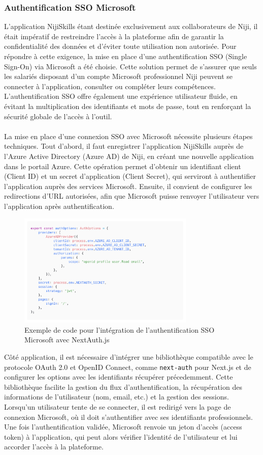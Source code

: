 \documentclass[12pt]{article}
\begin{document}
\subsubsection{Authentification SSO Microsoft}
L’application NijiSkills étant destinée exclusivement aux collaborateurs de Niji, il était impératif de restreindre l’accès à la plateforme afin de garantir la confidentialité des données et d’éviter toute utilisation non autorisée. Pour répondre à cette exigence, la mise en place d’une authentification SSO (Single Sign-On) via Microsoft a été choisie. Cette solution permet de s’assurer que seuls les salariés disposant d’un compte Microsoft professionnel Niji peuvent se connecter à l’application, consulter ou compléter leurs compétences. L’authentification SSO offre également une expérience utilisateur fluide, en évitant la multiplication des identifiants et mots de passe, tout en renforçant la sécurité globale de l’accès à l’outil.
\\\\
La mise en place d’une connexion SSO avec Microsoft nécessite plusieurs étapes techniques. Tout d’abord, il faut enregistrer l’application NijiSkills auprès de l’Azure Active Directory (Azure AD) de Niji, en créant une nouvelle application dans le portail Azure. Cette opération permet d’obtenir un identifiant client (Client ID) et un secret d’application (Client Secret), qui serviront à authentifier l’application auprès des services Microsoft. Ensuite, il convient de configurer les redirections d’URL autorisées, afin que Microsoft puisse renvoyer l’utilisateur vers l’application après authentification.
\begin{figure}[H]
  \centering
  \includegraphics[width=0.75\textwidth]{img/code-auth.png}
  \caption{Exemple de code pour l'intégration de l'authentification SSO Microsoft avec NextAuth.js}
\end{figure}
\noindent
Côté application, il est nécessaire d’intégrer une bibliothèque compatible avec le protocole OAuth 2.0 et OpenID Connect, comme \texttt{next-auth} pour Next.js et de configurer les options avec les identifiants récupérer précedemment. Cette bibliothèque facilite la gestion du flux d’authentification, la récupération des informations de l’utilisateur (nom, email, etc.) et la gestion des sessions. Lorsqu’un utilisateur tente de se connecter, il est redirigé vers la page de connexion Microsoft, où il doit s’authentifier avec ses identifiants professionnels. Une fois l’authentification validée, Microsoft renvoie un jeton d’accès (access token) à l’application, qui peut alors vérifier l’identité de l’utilisateur et lui accorder l’accès à la plateforme.
\end{document}
